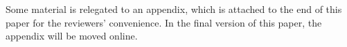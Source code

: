 Some material is relegated to an appendix, which is attached to the end of this paper for the reviewers' convenience. In the final version of this paper, the appendix will be moved online.


%
%
%
%
%
%
%
%
